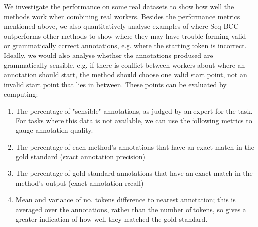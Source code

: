 We investigate the performance on some real datasets to show how well the methods work when combining real workers. Besides the performance metrics mentioned above, we also quantitatively analyse examples of where Seq-BCC outperforms other methods to show where they may have trouble forming valid or grammatically correct annotations, e.g. where the starting token is incorrect. 
Ideally, we would also analyse whether the annotations produced are grammatically sensible, e.g. if there is conflict between workers about where an annotation should start, the method should choose one valid start point, not an invalid start point that lies in between. These points can be evaluated by computing:
\begin{enumerate}
\item The percentage of "sensible" annotations, as judged by an expert for the task. For tasks where this data is not available, we can use the following metrics to gauge annotation quality.
\item The percentage of each method's annotations that have an exact match in the gold standard (exact annotation precision)
\item The percentage of gold standard annotations that have an exact match in the method's output (exact annotation recall)
\item Mean and variance of no. tokens difference to nearest annotation; this is averaged over the annotations, rather than the number of tokens, so gives a greater indication of how well they matched the gold standard.
\end{enumerate}
